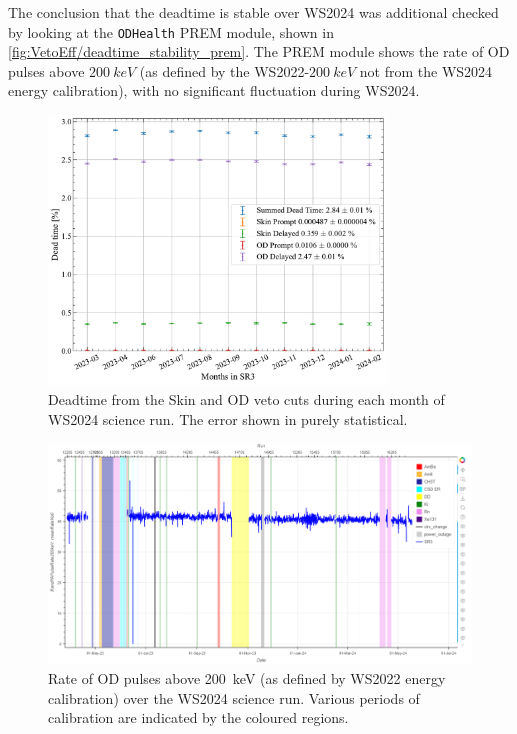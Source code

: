 The conclusion that the deadtime is stable over WS2024 was additional checked by looking at the \lstinline{ODHealth} PREM module, shown in \autoref{fig:VetoEff/deadtime_stability_prem}.
The PREM module shows the rate of OD pulses above $200~keV$ (as defined by the WS2022-$200~keV$ not from the WS2024 energy calibration), with no significant fluctuation during WS2024.
\begin{figure}[!ht]
	\centering
	\includegraphics[width=0.8\textwidth]{figures/VetoEfficiency/SR3DeadTimeAll_expoFunc.pdf}
	\caption{Deadtime from the Skin and OD veto cuts during each month of WS2024 science run. The error shown in purely statistical.}
	\label{fig:VetoEff/deadtime_stability}
\end{figure}
\begin{figure}[!ht]
	\centering
	\includegraphics[width=\textwidth]{figures/VetoEfficiency/prem_od_stability.png}
	\caption{Rate of OD pulses above 200~keV (as defined by WS2022 energy calibration) over the WS2024 science run. Various periods of calibration are indicated by the coloured regions.}
	\label{fig:VetoEff/deadtime_stability_prem}
\end{figure}


